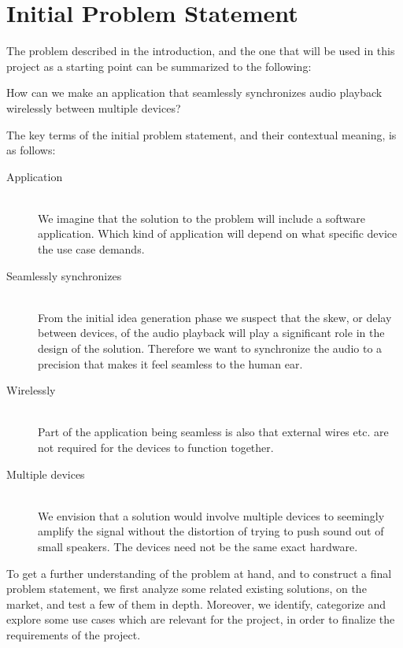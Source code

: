 \section{Initial Problem Statement}\label{sec:initial_problem}

The problem described in the introduction, and the one that will be used
in this project as a starting point can be summarized to the following:

\begin{problemstatement}
	How can we make an application that seamlessly synchronizes audio
	playback wirelessly between multiple devices?
\end{problemstatement}

\noindent
The key terms of the initial problem statement, and their contextual meaning,
is as follows:
\begin{description}
	\item[Application] \hfill \\
		We imagine that the solution to the problem will include a software
		application. Which kind of application will depend on what specific
		device the use case demands.
	\item[Seamlessly synchronizes]  \hfill \\
		From the initial idea generation phase we suspect
		that the skew, or delay between devices, of the audio playback will
		play a significant role in the design of the solution. Therefore we
		want to synchronize the audio to a precision that makes it feel
		seamless to the human ear.
	\item[Wirelessly]  \hfill \\
		Part of the application being seamless is also that external wires etc. are
		not required for the devices to function together.
	\item[Multiple devices]  \hfill \\
		We envision that a solution would involve multiple devices to seemingly
		amplify the signal without the distortion of trying to push sound out of
		small speakers. The devices need not be the same exact hardware.
\end{description}

To get a further understanding of the problem at hand, and to
construct a final problem statement, we first analyze some related
existing solutions, on the market, and test a few of them in depth.
Moreover, we identify, categorize and explore some use cases which are relevant for the project,
in order to finalize the requirements of the project.
